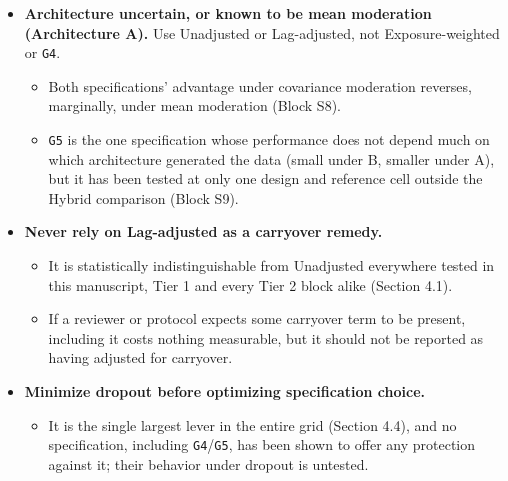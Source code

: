 \documentclass[
  11pt,
]{article}
\providecommand{\tightlist}{%
  \setlength{\itemsep}{0pt}\setlength{\parskip}{0pt}}
\begin{document}
\begin{itemize}
  \begin{itemize}
  \tightlist
  \item
    Exposure-weighted is markedly worse under CO (Section 3.4), and
    Block S9 shows \texttt{G4} and \texttt{G5} fail here too, \texttt{G4} catastrophically.
  \item
    \texttt{G4}'s AIC half-life selection systematically drifts to the
    largest candidate in its grid under CO's sparse, widely spaced
    off-drug sampling (chosen in over 85\% of replicates regardless of
    true half-life), collapsing its power to roughly half of
    Unadjusted's; it should specifically be avoided under any design
    with few, widely spaced off-drug observations.
  \item
    \texttt{G5} also underperforms Unadjusted under CO, though far more
    mildly.
  \item
    The classical lagged-treatment remedy adds nothing here either,
    including in the one design where its washout is long enough to
    give it a chance (Section 4.1).
  \end{itemize}
\item
  \textbf{Architecture uncertain, or known to be mean moderation
  (Architecture A).} Use Unadjusted or Lag-adjusted, not
  Exposure-weighted or \texttt{G4}.

  \begin{itemize}
  \tightlist
  \item
    Both specifications' advantage under covariance moderation
    reverses, marginally, under mean moderation (Block S8).
  \item
    \texttt{G5} is the one specification whose performance does not depend
    much on which architecture generated the data (small under B,
    smaller under A), but it has been tested at only one design and
    reference cell outside the Hybrid comparison (Block S9).
  \end{itemize}
\item
  \textbf{Never rely on Lag-adjusted as a carryover remedy.}

  \begin{itemize}
  \tightlist
  \item
    It is statistically indistinguishable from Unadjusted everywhere
    tested in this manuscript, Tier 1 and every Tier 2 block alike
    (Section 4.1).
  \item
    If a reviewer or protocol expects some carryover term to be
    present, including it costs nothing measurable, but it should not
    be reported as having adjusted for carryover.
  \end{itemize}
\item
  \textbf{Minimize dropout before optimizing specification choice.}

  \begin{itemize}
  \tightlist
  \item
    It is the single largest lever in the entire grid (Section 4.4),
    and no specification, including \texttt{G4}/\texttt{G5}, has been shown to
    offer any protection against it; their behavior under dropout is
    untested.
  \end{itemize}
\end{itemize}
\end{document}
